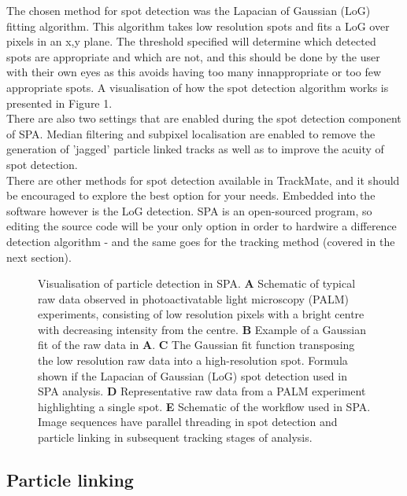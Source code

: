\documentclass[11pt]{article} %
\begin{document}
The chosen method for spot detection was the Lapacian of Gaussian (LoG) fitting algorithm. This algorithm takes low resolution spots and fits a LoG over pixels in an x,y plane. The threshold specified will determine which detected spots are appropriate and which are not, and this should be done by the user with their own eyes as this avoids having too many innappropriate or too few appropriate spots. A visualisation of how the spot detection algorithm works is presented in Figure 1.\\

There are also two settings that are enabled during the spot detection component of SPA. Median filtering and subpixel localisation are enabled to remove the generation of 'jagged' particle linked tracks as well as to improve the acuity of spot detection.\\

There are other methods for spot detection available in TrackMate, and it should be encouraged to explore the best option for your needs. Embedded into the software however is the LoG detection. SPA is an open-sourced program, so editing the source code will be your only option in order to hardwire a difference detection algorithm - and the same goes for the tracking method (covered in the next section).

	\begin{figure}[H]
	\caption{Visualisation of particle detection in SPA. \textbf{A} Schematic of typical raw data observed in photoactivatable light microscopy (PALM) 					experiments, consisting of low resolution pixels with a bright centre with decreasing intensity from the centre. \textbf{B} Example of a Gaussian fit of the raw 		data in \textbf{A}. \textbf{C} The Gaussian fit function transposing the low resolution raw data into a high-resolution spot. Formula shown if the Lapacian of 		Gaussian (LoG) spot detection used in SPA analysis. \textbf{D} Representative raw data from a PALM experiment highlighting a single spot. \textbf{E} 				Schematic of the workflow used in SPA. Image sequences have parallel threading in spot detection and particle linking in subsequent tracking stages of 			analysis.}
	\end{figure}

\subsection{Particle linking}
\end{document}
